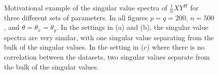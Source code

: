 \begin{figure}
{  }
  \caption{Motivational example of the singular value spectra of $\frac{1}{n}XY^H$ for three different sets of parameters. In all figures $p=q=200$, $n=500$, and $\theta=\theta_x=\theta_y$. In the settings in (a) and (b), the singular value spectra are very similar, with one singular value separating from the bulk of the singular values. In the setting in (c) where there is no correlation between the datasets, two singular values separate from the bulk of the singular values.}
  \label{fig:chpt6:motiv}
\end{figure}
